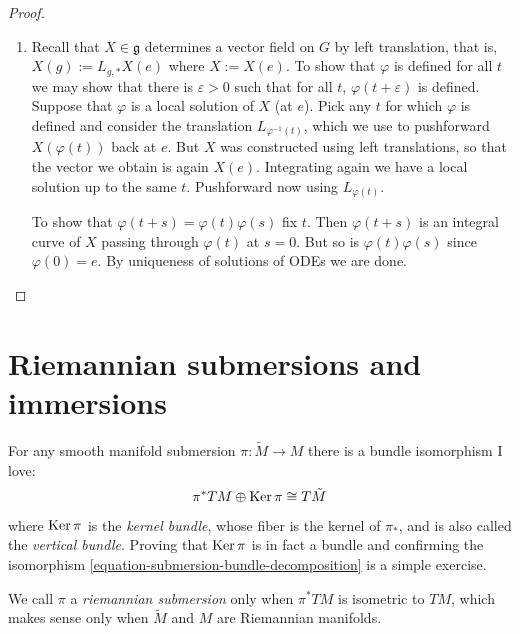 \begin{proof}
\begin{enumerate}
\item Recall that $X \in \mathfrak{g}$ determines a vector field on $G$
by left translation, that is, $X(g):=L_{g,*}X(e)$ where $X:=X(e)$.
To show that $\varphi$ is defined for all $t$
we may show that there is $\varepsilon>0$ such that for all $t$,
$\varphi(t+\varepsilon)$ is defined.
Suppose that $\varphi$ is a local solution of $X$ (at $e$).
Pick any $t$ for which $\varphi$ is defined and consider the translation
$L_{\varphi^{-1}(t)}$, which we use to pushforward $X(\varphi(t))$
back at $e$.
But $X$ was constructed using left translations,
so that the vector we obtain is again $X(e)$.
Integrating again we have a local solution up to the same $t$.
Pushforward now using $L_{\varphi(t)}$.

To show that $\varphi(t+s)=\varphi(t)\varphi(s)$
fix $t$. Then $\varphi(t+s)$ is an integral curve of $X$
passing through $\varphi(t)$ at $s=0$.
But so is $\varphi(t)\varphi(s)$ since $\varphi(0)=e$.
By uniqueness of solutions of ODEs we are done.
\end{enumerate}
\end{proof}


\section{Riemannian submersions and immersions}
\label{section-Riemannian-submersions-and-immersions}

For any smooth manifold submersion $\pi:\tilde{M}\to M$ there is a bundle
isomorphism I love: 
\begin{equation}
\label{equation-submersion-bundle-decomposition}
\pi^*TM \oplus \mathop{\mathrm{Ker}} \pi\cong
T\tilde{M} \end{equation}
 where $\mathop{\mathrm{Ker}}\pi$ is the {\it kernel bundle}, whose
fiber is the kernel of $\pi_*$, and is also called the {\it vertical bundle}.
Proving that $\mathop{\mathrm{Ker}}\pi$ is in fact a bundle and confirming the isomorphism
\ref{equation-submersion-bundle-decomposition} is a simple exercise.

We call $\pi$ a {\it riemannian submersion} only when $\pi^*TM$ is isometric to
$TM$, which makes sense only when $\tilde{M}$ and $M$ are Riemannian manifolds.

